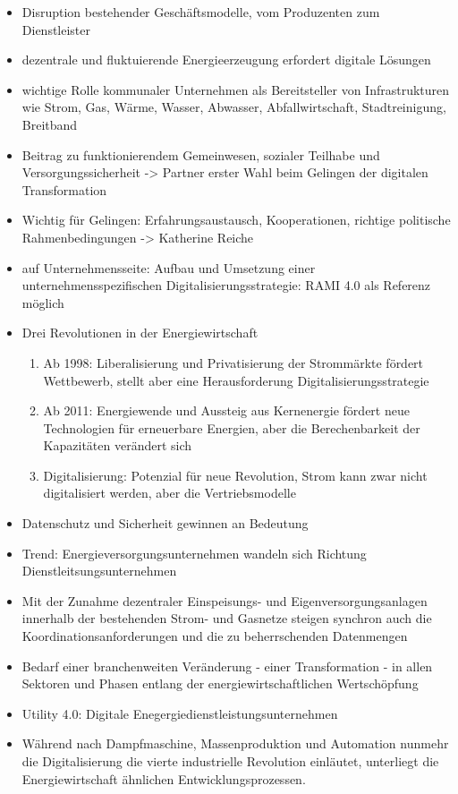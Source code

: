 \begin{itemize}
  \item Disruption bestehender Geschäftsmodelle, vom Produzenten zum Dienstleister \citep{Doleski2017}
  \item dezentrale und fluktuierende Energieerzeugung erfordert digitale Lösungen
  \item wichtige Rolle kommunaler Unternehmen als Bereitsteller von Infrastrukturen wie Strom, Gas, Wärme, Wasser, Abwasser, Abfallwirtschaft, Stadtreinigung, Breitband \citep{Doleski2017}
  \item Beitrag zu funktionierendem Gemeinwesen, sozialer Teilhabe und Versorgungssicherheit -> Partner erster Wahl beim Gelingen der digitalen Transformation
  \item Wichtig für Gelingen: Erfahrungsaustausch, Kooperationen, richtige politische Rahmenbedingungen -> Katherine Reiche
  \item auf Unternehmensseite: Aufbau und Umsetzung einer unternehmensspezifischen Digitalisierungsstrategie: RAMI 4.0 als Referenz möglich
  \item Drei Revolutionen in der Energiewirtschaft \citep{Doleski2017}
  \begin{enumerate}
    \item Ab 1998: Liberalisierung und Privatisierung der Strommärkte fördert Wettbewerb, stellt aber eine Herausforderung Digitalisierungsstrategie
    \item Ab 2011: Energiewende und Aussteig aus Kernenergie fördert neue Technologien für erneuerbare Energien, aber die Berechenbarkeit der Kapazitäten verändert sich
    \item Digitalisierung: Potenzial für neue Revolution, Strom kann zwar nicht digitalisiert werden, aber die Vertriebsmodelle
  \end{enumerate}
  \item Datenschutz und Sicherheit gewinnen an Bedeutung
  \item Trend: Energieversorgungsunternehmen wandeln sich Richtung Dienstleitsungsunternehmen
  \item \glqq Mit der Zunahme dezentraler Einspeisungs- und Eigenversorgungsanlagen innerhalb der bestehenden Strom- und Gasnetze steigen synchron auch die Koordinationsanforderungen und die zu beherrschenden Datenmengen \grqq{} \citep[S. 7]{Doleski2016}
  \item \glqq Bedarf einer branchenweiten Veränderung - einer Transformation - in allen Sektoren und Phasen entlang der energiewirtschaftlichen Wertschöpfung\grqq{} \cite[S. 11]{Doleski2016}
  \item Utility 4.0: Digitale Enegergiedienstleistungsunternehmen
  \item Während nach Dampfmaschine, Massenproduktion und Automation nunmehr die Digitalisierung die vierte industrielle Revolution einläutet, unterliegt die Energiewirtschaft ähnlichen Entwicklungsprozessen.
\end{itemize}

